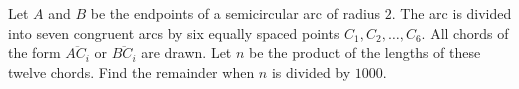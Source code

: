 Let $ A$ and $ B$ be the endpoints of a semicircular arc of radius $ 2$. The arc is divided into seven congruent arcs by six equally spaced points $ C_1,C_2,\ldots,C_6$. All chords of the form $ \overline{AC_i}$ or $ \overline{BC_i}$ are drawn. Let $ n$ be the product of the lengths of these twelve chords. Find the remainder when $ n$ is divided by $ 1000$.